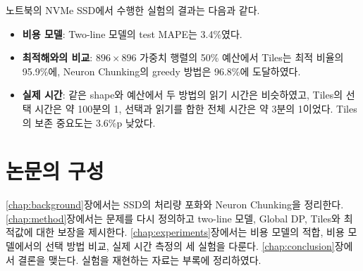 노트북의 NVMe SSD에서 수행한 실험의 결과는 다음과 같다.

\begin{itemize}
\item \textbf{비용 모델}: Two-line 모델의 test MAPE는 3.4\%였다.
\item \textbf{최적해와의 비교}: $896\times896$ 가중치 행렬의 50\% 예산에서 Tiles는 최적 비율의 95.9\%에, Neuron Chunking의 greedy 방법은 96.8\%에 도달하였다.
\item \textbf{실제 시간}: 같은 shape와 예산에서 두 방법의 읽기 시간은 비슷하였고, Tiles의 선택 시간은 약 100분의 1, 선택과 읽기를 합한 전체 시간은 약 3분의 1이었다. Tiles의 보존 중요도는 3.6\%p 낮았다.
\end{itemize}

\section{논문의 구성}\label{sec:intro-outline}

\ref{chap:background}장에서는 SSD의 처리량 포화와 Neuron Chunking을 정리한다. \ref{chap:method}장에서는 문제를 다시 정의하고 two-line 모델, Global DP, Tiles와 최적값에 대한 보장을 제시한다. \ref{chap:experiments}장에서는 비용 모델의 적합, 비용 모델에서의 선택 방법 비교, 실제 시간 측정의 세 실험을 다룬다. \ref{chap:conclusion}장에서 결론을 맺는다. 실험을 재현하는 자료는 부록에 정리하였다.
